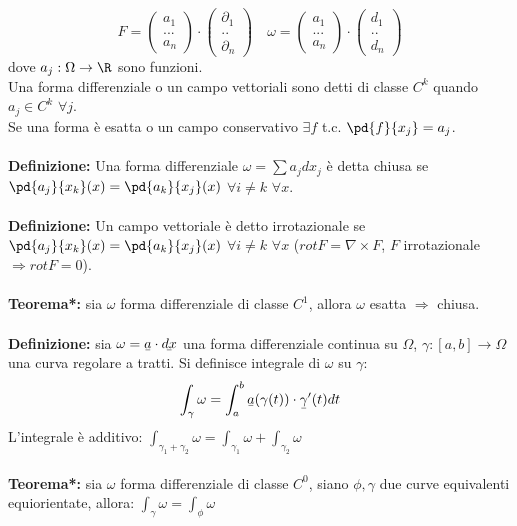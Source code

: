 \documentclass{article}
\begin{document}
$$ F = \begin{pmatrix} a_1\\...\\a_n \end{pmatrix} \cdot \begin{pmatrix} \partial_1\\..\\\partial_n \end{pmatrix}\quad \omega = \begin{pmatrix} a_1\\...\\a_n \end{pmatrix} \cdot \begin{pmatrix} d_1\\..\\d_n \end{pmatrix}$$
dove $a_j:\Omega\rightarrow\R$ sono funzioni.\\
Una forma differenziale o un campo vettoriali sono detti di classe $C^k$ quando $a_j\in C^k$ $\forall j$.\\
Se una forma è esatta o un campo conservativo $\exists f$ t.c. $\pd{f}{x_j}=a_j$.\\\\
\textbf{Definizione:} Una forma differenziale $\omega=\sum a_jdx_j$ è detta chiusa se $\pd{a_j}{x_k}(x)=\pd{a_k}{x_j}(x)$ $\forall i\neq k$ $\forall x$.\\\\
\textbf{Definizione:} Un campo vettoriale è detto irrotazionale se $\pd{a_j}{x_k}(x)=\pd{a_k}{x_j}(x)$ $\forall i\neq k$ $\forall x$ ($rotF=\nabla\times F$, $F$ irrotazionale $\Rightarrow rotF=0$).\\\\
\textbf{Teorema*:} sia $\omega$ forma differenziale di classe $C^1$, allora $\omega$ esatta $\Rightarrow$ chiusa.\\\\
\textbf{Definizione:} sia $\omega=\ubar{a}\cdot\ubar{dx}$ una forma differenziale continua su $\Omega$, $\gamma:[a,b]\rightarrow\Omega$ una curva regolare a tratti. Si definisce integrale di $\omega$ su $\gamma$:
$$ \int_\gamma\omega=\int_a^b\ubar{a}(\gamma(t))\cdot\ubar{\gamma}'(t)dt $$
L'integrale è additivo: $\int_{\gamma_1+\gamma_2}\omega=\int_{\gamma_1}\omega+\int_{\gamma_2}\omega$\\\\
\textbf{Teorema*:} sia $\omega$ forma differenziale di classe $C^0$, siano $\phi,\gamma$ due curve equivalenti equiorientate, allora: $\int_\gamma\omega=\int_\phi\omega$\\
\end{document}
